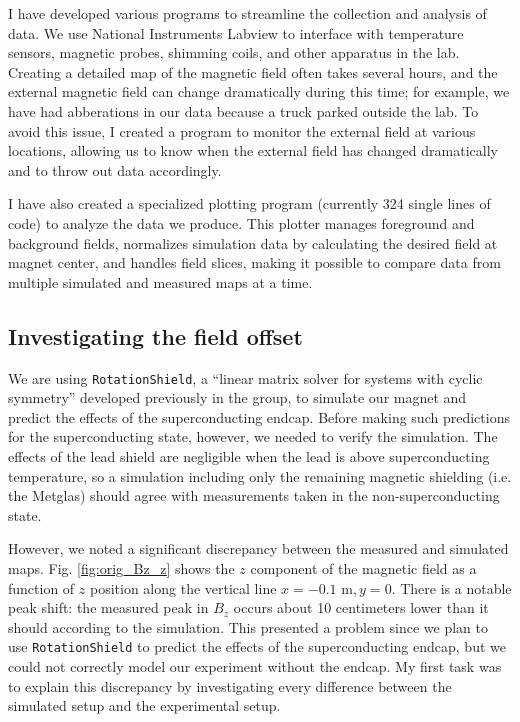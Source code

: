 \documentclass[twocolumn,aps,prb,citeautoscript]{revtex4-1}
\begin{document}
I have developed various programs to streamline the collection and analysis of data.
We use National Instruments Labview to interface with temperature sensors, magnetic probes, shimming coils,
and other apparatus in the lab. Creating a detailed map of the magnetic field often takes several hours,
and the external magnetic field
can change dramatically during this time; for example, we have had abberations in our data because a truck
parked outside the lab. To avoid this issue, I created a program to monitor the external field at various
locations, allowing us to know when the external field has changed dramatically and to throw out data accordingly.

I have also created a specialized plotting program (currently 324 single lines of code) to analyze the data
we produce. This plotter manages foreground and background fields, normalizes simulation
data by calculating the desired field at magnet center, and handles field slices, making it possible to
compare data from multiple simulated and measured maps at a time.

\subsection{Investigating the field offset}

We are using \texttt{RotationShield}, a ``linear matrix solver for systems with cyclic symmetry'' developed previously in the group, \cite{rotshield}
to simulate our magnet and predict the effects of the superconducting endcap. Before making such predictions
for the superconducting state, however, we needed to verify the simulation.
The effects of the lead shield are negligible when the lead is above superconducting temperature, so a simulation
including only the remaining magnetic shielding (i.e. the Metglas) should agree with measurements taken in
the non-superconducting state.

However, we noted a significant discrepancy between the measured and simulated maps.
Fig. \ref{fig:orig_Bz_z} shows the $z$ component of the magnetic field as a function of $z$ position along
the vertical line $x = -0.1\text{ m}, y = 0$. There is a notable peak shift: the measured peak in $B_z$ occurs
about 10 centimeters lower than it should according to the simulation. This presented a problem since we plan
to use \texttt{RotationShield} to predict the effects of the superconducting endcap, but we could not correctly
model our experiment without the endcap.
My first task was to explain this discrepancy by investigating every
difference between the simulated setup and the experimental setup.
\end{document}
